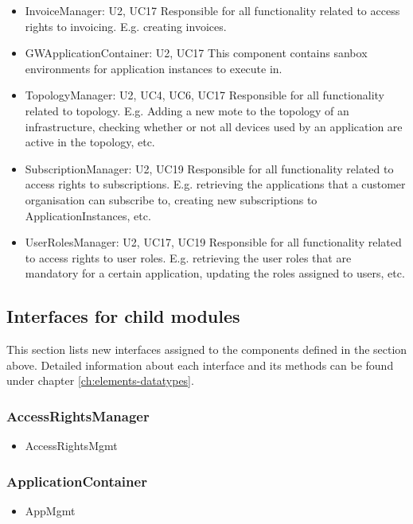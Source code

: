 {{{\begin{itemize}
            organisations that they are associated to, etc.
        \item InvoiceManager: U2, UC17
            Responsible for all functionality related to access rights to invoicing.
            E.g. creating invoices.
        \item GWApplicationContainer: U2, UC17
            This component contains sanbox environments for application instances to execute in.
        \item TopologyManager: U2, UC4, UC6, UC17
              Responsible for all functionality related to topology. E.g. Adding a new
              mote to the topology of an infrastructure, checking whether or not all
              devices used by an application are active in the topology, etc.
        \item SubscriptionManager: U2, UC19
              Responsible for all functionality related to access rights to subscriptions.
              E.g. retrieving the applications that a customer organisation can subscribe to,
              creating new subscriptions to ApplicationInstances, etc.
        \item UserRolesManager: U2, UC17, UC19
              Responsible for all functionality related to access rights to user roles.
              E.g. retrieving the user roles that are mandatory for a certain application,
              updating the roles assigned to users, etc.
    \end{itemize}


\subsection{Interfaces for child modules}
    This section lists new interfaces assigned to the components defined
    in the section above. Detailed information about each interface and
    its methods can be found under chapter \ref{ch:elements-datatypes}. \\

    \subsubsection{AccessRightsManager}
        \begin{itemize}
            \item AccessRightsMgmt
        \end{itemize}

    \subsubsection{ApplicationContainer}
        \begin{itemize}
            \item AppMgmt
        \end{itemize}

}}}
